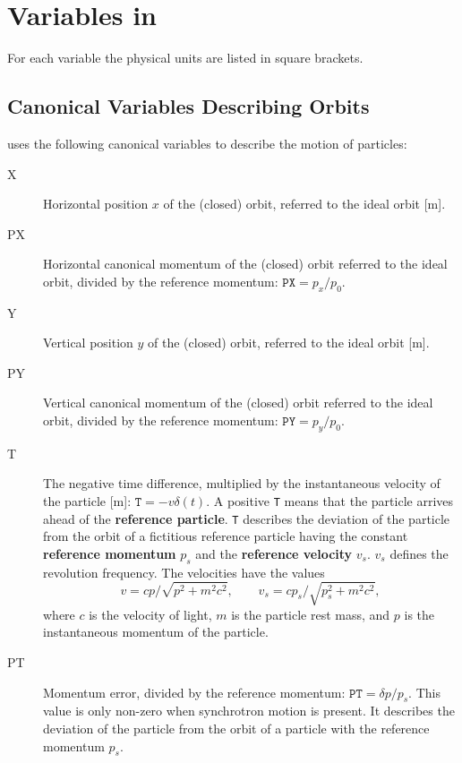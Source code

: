 \section{Variables in \opalmap}
\label{sec:variables}
For each variable the physical units are listed in square brackets.

\subsection{Canonical Variables Describing Orbits}
\label{sec:canon}
\opalmap uses the following canonical variables
to describe the motion of particles:

\begin{description}
\item[X]
  Horizontal position $x$ of the (closed) orbit,
  referred to the ideal orbit [m].

\item[PX]
  Horizontal canonical momentum of the (closed) orbit referred 
  to the ideal orbit, divided by the reference momentum:
  $\mathtt{PX} = p_x / p_0$.

\item[Y]
  Vertical position $y$ of the (closed) orbit,
  referred to the ideal orbit [m].

\item[PY]
  Vertical canonical momentum of the (closed) orbit referred 
  to the ideal orbit, divided by the reference momentum:
  $\mathtt{PY} = p_y / p_0$.

\item[T]
  The negative time difference, 
  multiplied by the instantaneous velocity of the particle [m]:
  $\mathtt{T} = - v \delta(t)$.
  A positive \texttt{T} means that the particle arrives ahead of the 
  \textbf{reference particle}.
  \texttt{T} describes the deviation of the particle from the orbit of 
  a fictitious reference particle having the constant 
  \textbf{reference momentum} $p_s$ and the 
  \textbf{reference velocity} $v_s$.
  $v_s$ defines the revolution frequency.
  The velocities have the values 
  \[
  v = c p / \sqrt{p^2 + m^2 c^2}, \qquad
  v_s = c p_s / \sqrt{p_s^2 + m^2 c^2},
  \]
  where $c$ is the velocity of light, $m$ is the particle rest mass, 
  and $p$ is the instantaneous momentum of the particle.

\item[PT]
  Momentum error, divided by the reference momentum:
  $\mathtt{PT} = \delta p / p_s$.
  This value is only non-zero when synchrotron motion is present.
  It describes the deviation of the particle from the orbit of a
  particle with the reference momentum $p_s$.
\end{description}

